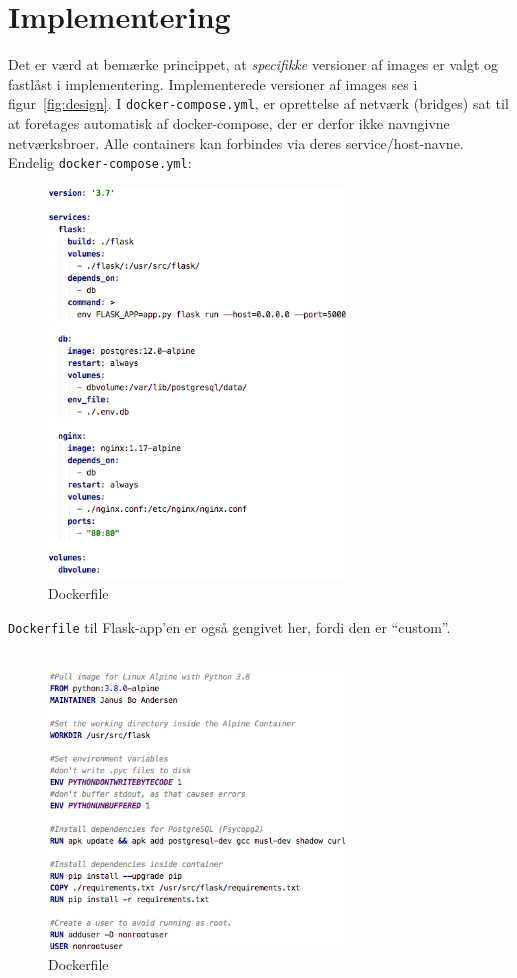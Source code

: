 \documentclass[a4paper]{article}
\begin{document}
\section{Implementering}
Det er værd at bemærke princippet, at \textit{specifikke} versioner af images er valgt og fastlåst i implementering.
Implementerede versioner af images ses i figur~\ref{fig:design}.
I \texttt{docker-compose.yml}, er oprettelse af netværk (bridges) sat til at foretages automatisk af docker-compose,
der er derfor ikke navngivne netværksbroer. Alle containers kan forbindes via deres service/host-navne.
Endelig \texttt{docker-compose.yml}:

\begin{figure}[H]
\centering
\includegraphics[width=8cm]{../img/docker-compose.png}
\caption{Dockerfile\label{fig:dockercompose}}
\end{figure}

\texttt{Dockerfile} til Flask-app'en er også gengivet her, fordi den er ``custom''.
\\\\
\begin{figure}[H]
\centering
\includegraphics[width=8cm]{../img/dockerfile.png}
\caption{Dockerfile\label{fig:dockerfile}}
\end{figure}
\end{document}
